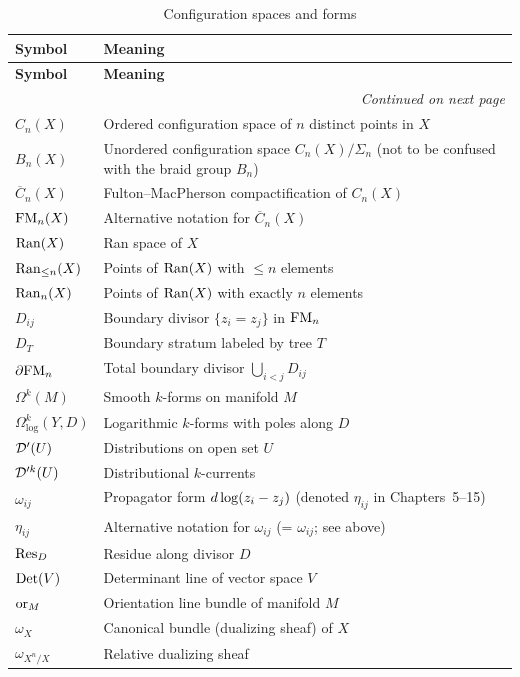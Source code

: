 \begin{longtable}{p{3cm} p{10cm}}
\caption{Configuration spaces and forms} \\
\toprule
\textbf{Symbol} & \textbf{Meaning} \\
\midrule
\endfirsthead
\toprule
\textbf{Symbol} & \textbf{Meaning} \\
\midrule
\endhead
\midrule
\multicolumn{2}{r}{\textit{Continued on next page}} \\
\endfoot
\bottomrule
\endlastfoot

$C_n(X)$ & Ordered configuration space of $n$ distinct points in $X$ \\
$B_n(X)$ & Unordered configuration space $C_n(X)/\Sigma_n$ (not to be confused with the braid group $B_n$) \\
$\overline{C}_n(X)$ & Fulton--MacPherson compactification of $C_n(X)$ \\
$\mathrm{FM}_n(X)$ & Alternative notation for $\overline{C}_n(X)$ \\
$\operatorname{Ran}(X)$ & Ran space of $X$ \\
$\operatorname{Ran}_{\leq n}(X)$ & Points of $\operatorname{Ran}(X)$ with $\leq n$ elements \\
$\operatorname{Ran}_n(X)$ & Points of $\operatorname{Ran}(X)$ with exactly $n$ elements \\
$D_{ij}$ & Boundary divisor $\{z_i = z_j\}$ in $\mathrm{FM}_n$ \\
$D_T$ & Boundary stratum labeled by tree $T$ \\
$\partial \mathrm{FM}_n$ & Total boundary divisor $\bigcup_{i < j} D_{ij}$ \\
$\Omega^k(M)$ & Smooth $k$-forms on manifold $M$ \\
$\Omega^k_{\log}(Y, D)$ & Logarithmic $k$-forms with poles along $D$ \\
$\mathcal{D}'(U)$ & Distributions on open set $U$ \\
$\mathcal{D}'^k(U)$ & Distributional $k$-currents \\
$\omega_{ij}$ & Propagator form $d\log(z_i - z_j)$ (denoted $\eta_{ij}$ in Chapters~5--15) \\
$\eta_{ij}$ & Alternative notation for $\omega_{ij}$ (= $\omega_{ij}$; see above) \\
$\operatorname{Res}_D$ & Residue along divisor $D$ \\
$\mathrm{Det}(V)$ & Determinant line of vector space $V$ \\
$\mathrm{or}_{M}$ & Orientation line bundle of manifold $M$ \\
$\omega_X$ & Canonical bundle (dualizing sheaf) of $X$ \\
$\omega_{X^n/X}$ & Relative dualizing sheaf \\
\end{longtable}


